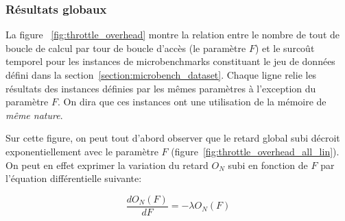 
\subsubsection{Résultats globaux}
La figure ~\ref{fig:throttle_overhead} montre la relation entre le nombre de tout de boucle de calcul par tour de boucle d'accès (le paramètre $F$) et le surcoût temporel pour les instances de microbenchmarks constituant le jeu de données défini dans la section~\ref{section:microbench_dataset}.
Chaque ligne relie les résultats des instances définies par les mêmes paramètres à l'exception du paramètre $F$.
On dira que ces instances ont une utilisation de la mémoire de \emph{même nature}.

Sur cette figure, on peut tout d'abord observer que le retard global subi décroit exponentiellement avec le paramètre $F$ (figure~\ref{fig:throttle_overhead_all_lin}).
On peut en effet exprimer la variation du retard $O_N$ subi en fonction de $F$ par l'équation différentielle suivante:

\begin{equation}
	\frac{dO_N(F)}{dF} = - \lambda O_N(F)
\end{equation}

